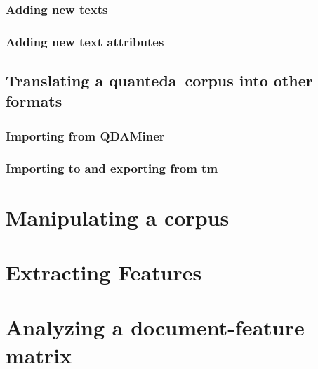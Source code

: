 \documentclass[11pt]{article}\usepackage[]{graphicx}\usepackage[]{color}
\newcommand{\quanteda}{\textsf{quanteda}\ }
\begin{document}
\subsubsection{Adding new texts}

\subsubsection{Adding new text attributes}


\subsection{Translating a \quanteda corpus into other formats}

\subsubsection{Importing from QDAMiner}

\subsubsection{Importing to and exporting from \textsf{tm}}


\section{Manipulating a corpus}


\section{Extracting Features}


\section{Analyzing a document-feature matrix}


\end{document}
